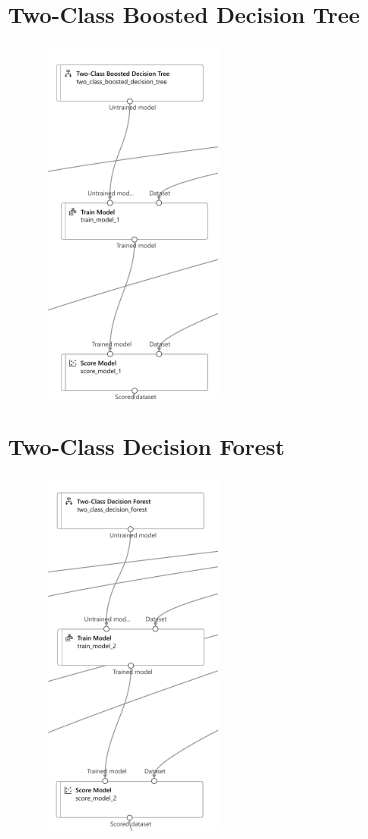 \subsection{Two-Class Boosted Decision Tree}
\begin{figure}[H]
    \centering
    \includegraphics[width=0.4\textwidth]{images/dt_pipe}
    \label{fig:dt-pipe}
\end{figure}

\subsection{Two-Class Decision Forest}
\begin{figure}[H]
    \centering
    \includegraphics[width=0.4\textwidth]{images/df_pipe}
    \label{fig:df-pipe}
\end{figure}

